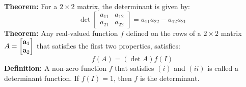 \documentclass{article}
\begin{document}
\begin{minipage}[t]{.45\linewidth}
        \textbf{Theorem:} For a $2\times 2$ matrix, the determinant is given by:
        \begin{equation*}
            \det \begin{bmatrix}
                a_{11} & a_{12} \\ 
                a_{21} & a_{22} 
            \end{bmatrix} = a_{11}a_{22} - a_{12}a_{21}
        \end{equation*}
        \textbf{Theorem:} Any real-valued function $f$ defined on the rows of a $2\times 2$ matrix $A = \begin{bmatrix}
            \mathbf{a}_1 \\ \mathbf{a}_2
        \end{bmatrix}$ that satisfies the first two properties, satisfies:
        \begin{equation*}
            f(A) = (\det A)f(I)
        \end{equation*}
        \textbf{Definition:} A non-zero function $f$ that satisfies $(i)$ and $(ii)$ is called a determinant function. If $f(I)=1$, then $f$ is the determinant.
    \end{minipage}
    \newpage
\end{document}
